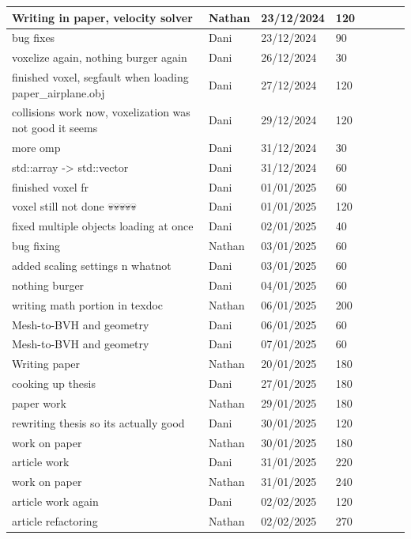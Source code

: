 \documentclass[a4paper,12pt,titlepage]{article}
\begin{document}
\begin{longtable}{|p{200pt}|l|l|l|l|l|l|l|}
	Writing in paper, velocity solver & Nathan & 23/12/2024 & 120 \\ \hline
	bug fixes & Dani & 23/12/2024 & 90 \\ \hline
	voxelize again, nothing burger again & Dani & 26/12/2024 & 30 \\ \hline
	finished  voxel, segfault when loading paper\_airplane.obj & Dani & 27/12/2024 & 120 \\ \hline
	collisions work now, voxelization was not good it seems & Dani & 29/12/2024 & 120 \\ \hline
	more omp & Dani & 31/12/2024 & 30 \\ \hline
	std::array -> std::vector & Dani & 31/12/2024 & 60 \\ \hline
	finished voxel fr & Dani & 01/01/2025 & 60 \\ \hline
	voxel still not done 💀💀💀💀💀 & Dani & 01/01/2025 & 120 \\ \hline
	fixed multiple objects loading at once & Dani & 02/01/2025 & 40 \\ \hline
	bug fixing & Nathan & 03/01/2025 & 60 \\ \hline
	added scaling settings n whatnot & Dani & 03/01/2025 & 60 \\ \hline
	nothing burger & Dani & 04/01/2025 & 60 \\ \hline
	writing math portion in texdoc & Nathan & 06/01/2025 & 200 \\ \hline
	Mesh-to-BVH and geometry & Dani & 06/01/2025 & 60 \\ \hline
	Mesh-to-BVH and geometry & Dani & 07/01/2025 & 60 \\ \hline
	Writing paper & Nathan & 20/01/2025 & 180 \\ \hline
	cooking up thesis & Dani & 27/01/2025 & 180 \\ \hline
	paper work & Nathan & 29/01/2025 & 180 \\ \hline
	rewriting thesis so its actually good & Dani & 30/01/2025 & 120 \\ \hline
	work on paper & Nathan & 30/01/2025 & 180 \\ \hline
	article work & Dani & 31/01/2025 & 220 \\ \hline
	work on paper & Nathan & 31/01/2025 & 240 \\ \hline
	article work again & Dani & 02/02/2025 & 120 \\ \hline
	article refactoring & Nathan & 02/02/2025 & 270 \\ \hline
\end{longtable}
\end{document}
